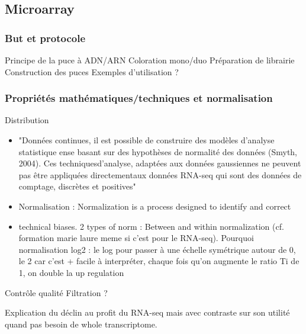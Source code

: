 \subsection{Microarray}

\subsubsection{But et protocole}

Principe de la puce à ADN/ARN
Coloration mono/duo
Préparation de librairie
Construction des puces
Exemples d'utilisation ?

\subsubsection{Propriétés mathématiques/techniques et normalisation}
\label{subsubsection:microarray_props_and_normalisation}

Distribution
\begin{itemize}
\item  "Données continues, il est possible de construire des modèles d’analyse statistique ense basant sur des hypothèses de normalité des données (Smyth, 2004). Ces techniquesd’analyse, adaptées aux données gaussiennes ne peuvent pas être appliquées directementaux données RNA-seq qui sont des données de comptage, discrètes et positives" %
\item     Normalisation : Normalization is a process designed to identify and correct
\item technical biases. 2 types of norm : Between and within normalization (cf. formation marie laure meme si c'est pour le RNA-seq). Pourquoi normalisation log2 : le log pour passer à une échelle symétrique autour de 0, le 2 car c'est + facile à interpréter, chaque fois qu'on augmente le ratio Ti de 1, on double la up regulation  
\end{itemize}
Contrôle qualité
Filtration ?


Explication du déclin au profit du RNA-seq mais avec contraste sur son utilité quand pas besoin de whole transcriptome.





